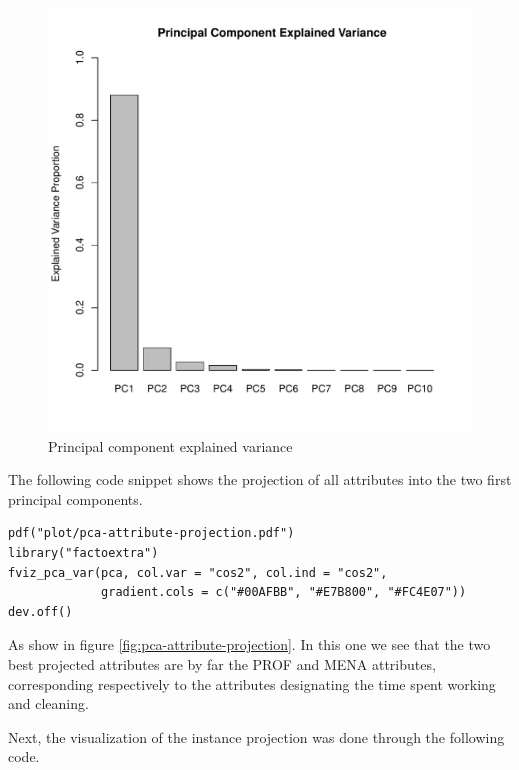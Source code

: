 \documentclass[11pt]{article}
\begin{document}
\begin{figure}[H]
  \centering
  \includegraphics[scale=0.5]{../plot/principal-component-explained-variance.pdf}
  \caption{Principal component explained variance}
  \label{fig:principal-component-explained-variance}
\end{figure}
The following code snippet shows the projection of all attributes into the two
first principal components.
\begin{verbatim}
pdf("plot/pca-attribute-projection.pdf")
library("factoextra")
fviz_pca_var(pca, col.var = "cos2", col.ind = "cos2",
             gradient.cols = c("#00AFBB", "#E7B800", "#FC4E07"))
dev.off()
\end{verbatim}
As show in figure \ref{fig:pca-attribute-projection}. In this one we see that
the two best projected attributes are by far the PROF and MENA attributes,
corresponding respectively to the attributes designating the time spent working
and cleaning.\par Next, the visualization of the instance projection was done
through the following code.
\end{document}
